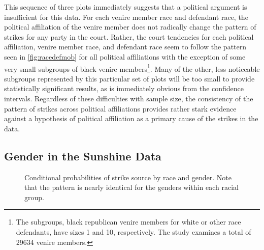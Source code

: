 This sequence of three plots immediately suggests that a political argument is insufficient for this data. For each venire member
race and defendant race, the political affiliation of the venire member does not radically change the pattern of strikes for any
party in the court. Rather, the court tendencies for each political affiliation, venire member race, and defendant race seem to
follow the pattern seen in \ref{fig:racedefmob} for all political affiliations with the exception of some very small subgroups of
black venire members\footnote{The subgroups, black republican venire members for white or other race defendants, have sizes 1 and
  10, respectively. The study examines a total of 29634 venire
  members.}. Many of the other, less
noticeable subgroups represented by this particular set of plots will be too small to provide statistically significant
results, as is immediately obvious from the confidence intervals. Regardless of these difficulties with sample size, the consistency of the pattern of strikes across political
affiliations provides rather stark evidence against a hypothesis of political affiliation as a primary cause of the strikes in the
data.

\subsection{Gender in the Sunshine Data}

\begin{figure}[h!]
  \centering
  \caption[Strikes by Race and Gender (Sunshine)]
  {\footnotesize Conditional probabilities of strike source by race and gender. Note that the pattern is nearly identical for the genders within
    each racial group.} \label{fig:racegenpol}
\end{figure}

